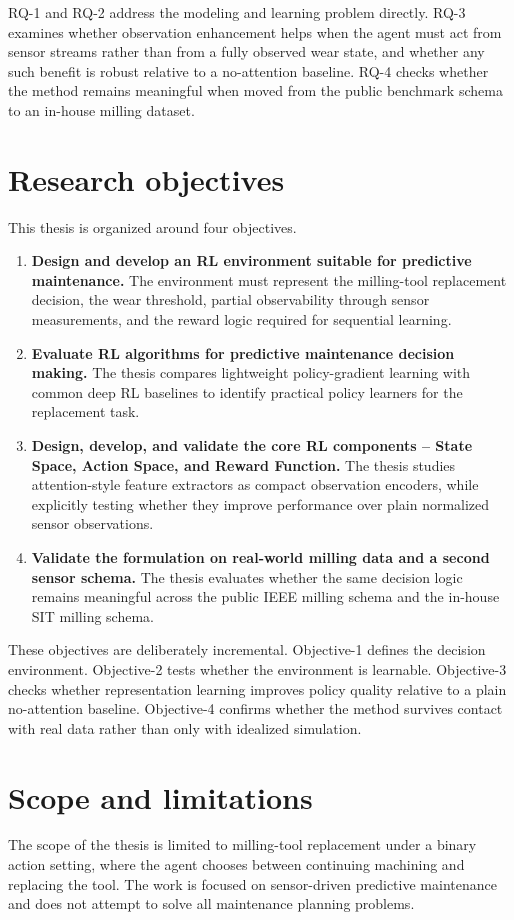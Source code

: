 \documentclass[12pt,oneside]{book}
\begin{document}
RQ-1 and RQ-2 address the modeling and learning problem directly. RQ-3 examines whether observation enhancement helps when the agent must act from sensor streams rather than from a fully observed wear state, and whether any such benefit is robust relative to a no-attention baseline. RQ-4 checks whether the method remains meaningful when moved from the public benchmark schema to an in-house milling dataset.

\section{Research objectives}
This thesis is organized around four objectives.

\begin{enumerate}[leftmargin=*,label=\textbf{Objective-\arabic*}]
	\item \textbf{Design and develop an RL environment suitable for predictive maintenance.} The environment must represent the milling-tool replacement decision, the wear threshold, partial observability through sensor measurements, and the reward logic required for sequential learning.
	\item \textbf{Evaluate RL algorithms for predictive maintenance decision making.} The thesis compares lightweight policy-gradient learning with common deep RL baselines to identify practical policy learners for the replacement task.
	\item \textbf{Design, develop, and validate the core RL components – State Space, Action Space, and Reward Function.} The thesis studies attention-style feature extractors as compact observation encoders, while explicitly testing whether they improve performance over plain normalized sensor observations.
	\item \textbf{Validate the formulation on real-world milling data and a second sensor schema.} The thesis evaluates whether the same decision logic remains meaningful across the public IEEE milling schema and the in-house SIT milling schema.
\end{enumerate}

These objectives are deliberately incremental. Objective-1 defines the decision environment. Objective-2 tests whether the environment is learnable. Objective-3 checks whether representation learning improves policy quality relative to a plain no-attention baseline. Objective-4 confirms whether the method survives contact with real data rather than only with idealized simulation.

\section{Scope and limitations}
The scope of the thesis is limited to milling-tool replacement under a binary action setting, where the agent chooses between continuing machining and replacing the tool. The work is focused on sensor-driven predictive maintenance and does not attempt to solve all maintenance planning problems.
\end{document}
